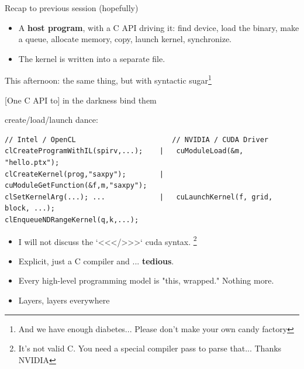\begin{frame}{Recap to previous session (hopefully)}
\begin{itemize}
    \item A \textbf{host program}, with a C API driving it: find device, load the binary, make a queue, allocate memory, copy, launch kernel, synchronize.
    \item The kernel is written into a separate file.
\end{itemize}
This afternoon: the same thing, but with syntactic sugar\footnote{And we have enough diabetes... Please don't make your own candy factory}
\end{frame}



\begin{frame}[fragile]{[One C API to] in the darkness bind them}

create/load/launch dance:
\begin{verbatim}
// Intel / OpenCL                       // NVIDIA / CUDA Driver
clCreateProgramWithIL(spirv,...);    |   cuModuleLoad(&m, "hello.ptx");
clCreateKernel(prog,"saxpy");        |   cuModuleGetFunction(&f,m,"saxpy");
clSetKernelArg(...); ...             |   cuLaunchKernel(f, grid, block, ...);
clEnqueueNDRangeKernel(q,k,...);      
\end{verbatim}
\begin{itemize}
    \item  I will not discuss the `<<</>>>` cuda syntax. \footnote{It's not valid C. You need a special compiler pass to parse that... Thanks NVIDIA}
    \item Explicit, just a C compiler and ... \textbf{tedious}.
    \item Every high-level programming model is "this, wrapped." Nothing more.
    \item Layers, layers everywhere
\end{itemize}

\end{frame}



